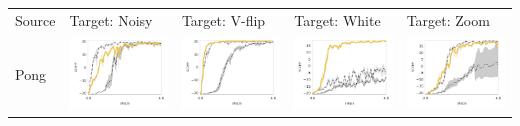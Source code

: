 


\begin{table}
     \begin{tabular}{m{} >{\centering}m{} >{\centering}m{} >{\centering}m{} >{\centering\arraybackslash}m{} }
	Source & Target: Noisy & Target: V-flip & Target: White & Target: Zoom \\
     	
	Pong &
        \includegraphics[width=.22\textwidth]{figures/app_plots/pongs/pong/pong_noise} &
        \includegraphics[width=.22\textwidth]{figures/app_plots/pongs/pong/pong_v_flip} &
        \includegraphics[width=.22\textwidth]{figures/app_plots/pongs/pong/pong_white} &
        \includegraphics[width=.22\textwidth]{figures/app_plots/pongs/pong/pong_zoom} \\


\end{tabular}
\end{table}

